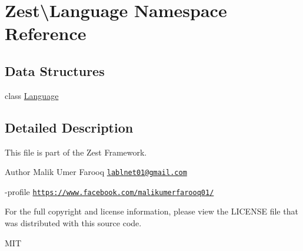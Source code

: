 \hypertarget{namespace_zest_1_1_language}{}\section{Zest\textbackslash{}Language Namespace Reference}
\label{namespace_zest_1_1_language}
\subsection*{Data Structures}
\begin{DoxyCompactItemize}
\item 
class \mbox{\hyperlink{class_zest_1_1_language_1_1_language}{Language}}
\end{DoxyCompactItemize}


\subsection{Detailed Description}
This file is part of the Zest Framework.

\begin{DoxyAuthor}{Author}
Malik Umer Farooq \href{mailto:lablnet01@gmail.com}{\tt lablnet01@gmail.\+com} 

-\/profile \href{https://www.facebook.com/malikumerfarooq01/}{\tt https\+://www.\+facebook.\+com/malikumerfarooq01/}
\end{DoxyAuthor}
For the full copyright and license information, please view the L\+I\+C\+E\+N\+SE file that was distributed with this source code.

M\+IT 